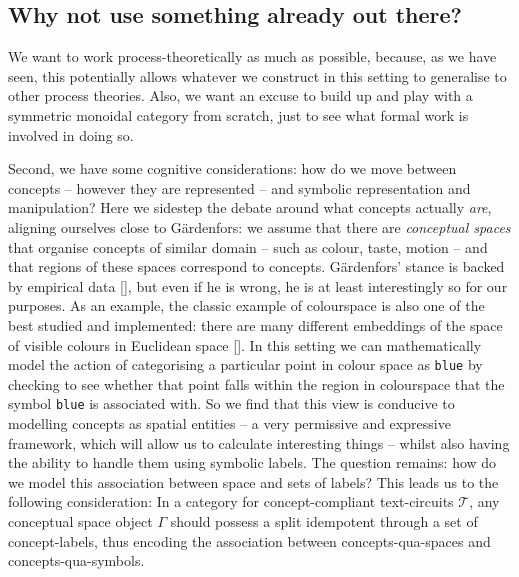 \begin{fullwidth}
\subsection{Why not use something already out there?}

 We want to work process-theoretically as much as possible, because, as we have seen, this potentially allows whatever we construct in this setting to generalise to other process theories. Also, we want an excuse to build up and play with a symmetric monoidal category from scratch, just to see what formal work is involved in doing so.

\label{just:rel} Second, we have some cognitive considerations: how do we move between concepts -- however they are represented -- and symbolic representation and manipulation? Here we sidestep the debate around what concepts actually \emph{are}, aligning ourselves close to G\"{a}rdenfors: we assume that there are \emph{conceptual spaces} that organise concepts of similar domain -- such as colour, taste, motion -- and that regions of these spaces correspond to concepts. G\"{a}rdenfors' stance is backed by empirical data [], but even if he is wrong, he is at least interestingly so for our purposes. As an example, the classic example of colourspace is also one of the best studied and implemented: there are many different embeddings of the space of visible colours in Euclidean space []. In this setting we can mathematically model the action of categorising a particular point in colour space as \texttt{blue} by checking to see whether that point falls within the region in colourspace that the symbol \texttt{blue} is associated with. So we find that this view is conducive to modelling concepts as spatial entities -- a very permissive and expressive framework, which will allow us to calculate interesting things -- whilst also having the ability to handle them using symbolic labels. The question remains: how do we model this association between space and sets of labels? This leads us to the following consideration: In a category for concept-compliant text-circuits $\mathcal{T}$, any conceptual space object $\Gamma$ should possess a split idempotent through a set of concept-labels, thus encoding the association between concepts-qua-spaces and concepts-qua-symbols.\\


\end{fullwidth}

